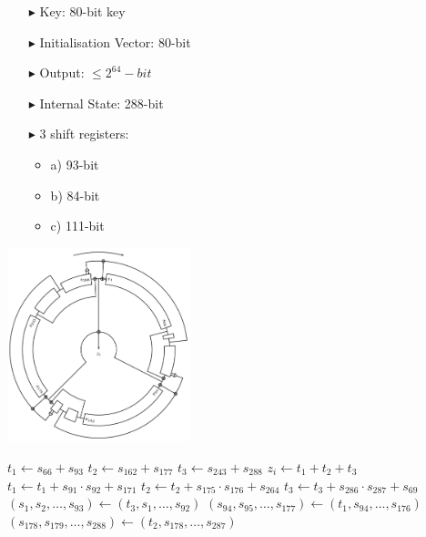\documentclass[conference]{IEEEtran}
\begin{document}
\begin{itemize}
\item[$\blacktriangleright$] Key: 80-bit key
\item[$\blacktriangleright$] Initialisation Vector: 80-bit
\item[$\blacktriangleright$] Output: $\leq2^{64}-bit$
\item[$\blacktriangleright$] Internal State: 288-bit
\item[$\blacktriangleright$] 3 shift registers:
\begin{itemize}
\item a) 93-bit
\item b) 84-bit
\item c) 111-bit
\end{itemize}
\end{itemize}
\includegraphics[width=0.4\textwidth]{figures/round.png}\cite{circle}


\begin{algorithm}[H]
\begin{algorithmic}[1]
 
\State $t_1 \gets s_{66} + s_{93}$
\State $t_2 \gets s_{162} + s_{177}$
\State $t_3 \gets s_{243} + s_{288}$
\State
\State $z_i \gets t_1 + t_2 + t_3$
\State
\State $t_1 \gets t_1 + s_{91} \cdot s_{92} + s_{171}$
\State $t_2 \gets t_2 + s_{175} \cdot s_{176} + s_{264}$
\State $t_3 \gets t_3 + s_{286} \cdot s_{287} + s_{69}$
\State
\State $(s_1,s_2,\dots,s_{93}) \gets (t_3,s_1,\dots,s_{92})$
\State $(s_{94},s_{95},\dots,s_{177}) \gets (t_1,s_{94},\dots,s_{176})$
\State $(s_{178},s_{179},\dots,s_{288}) \gets (t_2,s_{178},\dots,s_{287})$
\EndFor
\end{algorithmic}
\end{algorithm}
\end{document}
